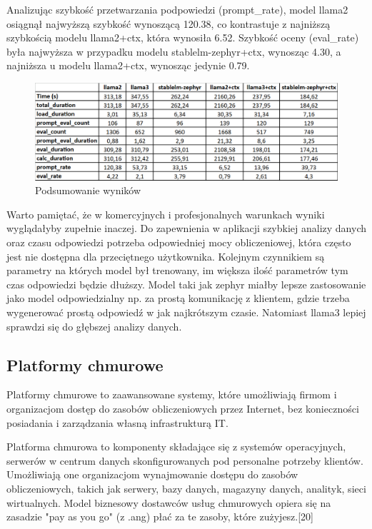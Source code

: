 Analizując szybkość przetwarzania podpowiedzi (prompt\_rate), model llama2 osiągnął najwyższą szybkość wynoszącą 120.38, co kontrastuje z najniższą szybkością modelu llama2+ctx, która wynosiła 6.52. Szybkość oceny (eval\_rate) była najwyższa w przypadku modelu stablelm-zephyr+ctx, wynosząc 4.30, a najniższa u modelu llama2+ctx, wynosząc jedynie 0.79.

\begin{figure}[H]
    \centering
    \includegraphics[width=1\textwidth]{Obrazy/benchmark_excel.png}
    \caption{Podsumowanie wyników}
    \label{fig:my_label}
\end{figure}

Warto pamiętać, że w komercyjnych i profesjonalnych warunkach wyniki wyglądałyby zupełnie inaczej. Do zapewnienia w aplikacji szybkiej analizy danych oraz czasu odpowiedzi potrzeba odpowiedniej mocy obliczeniowej, która często jest nie dostępna dla przeciętnego użytkownika. Kolejnym czynnikiem są parametry na których model był trenowany, im większa ilość parametrów tym czas odpowiedzi będzie dłuższy. Model taki jak zephyr miałby lepsze zastosowanie jako model odpowiedzialny np. za prostą komunikację z klientem, gdzie trzeba wygenerować prostą odpowiedź w jak najkrótszym czasie. Natomiast llama3 lepiej sprawdzi się do głębszej analizy danych.

\subsection{Platformy chmurowe}
Platformy chmurowe to zaawansowane systemy, które umożliwiają firmom i organizacjom dostęp do zasobów obliczeniowych przez Internet, bez konieczności posiadania i zarządzania własną infrastrukturą IT.

Platforma chmurowa to komponenty składające się z systemów operacyjnych, serwerów w centrum danych skonfigurowanych pod personalne potrzeby klientów. Umożliwiają one organizacjom wynajmowanie dostępu do zasobów obliczeniowych, takich jak serwery, bazy danych, magazyny danych, analityk, sieci wirtualnych. Model biznesowy dostawców usług chmurowych opiera się na zasadzie "pay as you go" (z .ang) płać za te zasoby, które zużyjesz.[20]

